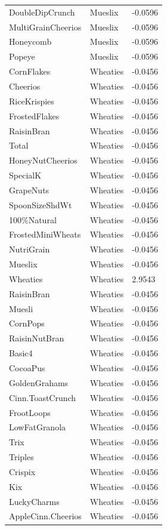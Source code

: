 \begin{table}[!htbp]
\begin{tabular}{lll}
DoubleDipCrunch & Mueslix & -0.0596
\\
MultiGrainCheerios & Mueslix & -0.0596
\\
Honeycomb & Mueslix & -0.0596
\\
Popeye & Mueslix & -0.0596
\\
CornFlakes & Wheaties & -0.0456
\\
Cheerios & Wheaties & -0.0456
\\
RiceKrispies & Wheaties & -0.0456
\\
FrostedFlakes & Wheaties & -0.0456
\\
RaisinBran & Wheaties & -0.0456
\\
Total & Wheaties & -0.0456
\\
HoneyNutCheerios & Wheaties & -0.0456
\\
SpecialK & Wheaties & -0.0456
\\
GrapeNuts & Wheaties & -0.0456
\\
SpoonSizeShdWt & Wheaties & -0.0456
\\
100\%Natural & Wheaties & -0.0456
\\
FrostedMiniWheats & Wheaties & -0.0456
\\
NutriGrain & Wheaties & -0.0456
\\
Mueslix & Wheaties & -0.0456
\\
Wheaties & Wheaties & 2.9543
\\
RaisinBran & Wheaties & -0.0456
\\
Muesli & Wheaties & -0.0456
\\
CornPops & Wheaties & -0.0456
\\
RaisinNutBran & Wheaties & -0.0456
\\
Basic4 & Wheaties & -0.0456
\\
CocoaPus & Wheaties & -0.0456
\\
GoldenGrahams & Wheaties & -0.0456
\\
Cinn.ToastCrunch & Wheaties & -0.0456
\\
FrootLoops & Wheaties & -0.0456
\\
LowFatGranola & Wheaties & -0.0456
\\
Trix & Wheaties & -0.0456
\\
Triples & Wheaties & -0.0456
\\
Crispix & Wheaties & -0.0456
\\
Kix & Wheaties & -0.0456
\\
LuckyCharms & Wheaties & -0.0456
\\
AppleCinn.Cheerios & Wheaties & -0.0456
\\

\end{tabular}
\end{table}

